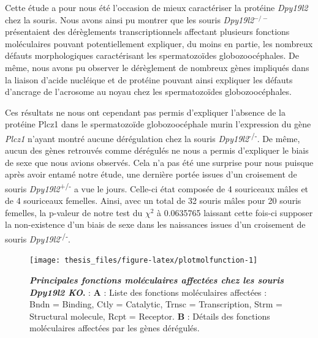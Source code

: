 \documentclass[12pt,twoside]{ugathesis}
\begin{document}
Cette étude a pour nous été l'occasion de mieux caractériser la protéine
\emph{Dpy19l2} chez la souris. Nous avons ainsi pu montrer que les
souris \emph{Dpy19l2}\(^{-/-}\) présentaient des dérèglements
transcriptionnels affectant plusieurs fonctions moléculaires pouvant
potentiellement expliquer, du moins en partie, les nombreux défauts
morphologiques caractérisant les spermatozoïdes globozoocéphales. De
même, nous avons pu observer le dérèglement de nombreux gènes impliqués
dans la liaison d'acide nucléique et de protéine pouvant ainsi expliquer
les défauts d'ancrage de l'acrosome au noyau chez les spermatozoïdes
globozoocéphales.

Ces résultats ne nous ont cependant pas permis d'expliquer l'absence de
la protéine Plcz1 dans le spermatozoïde globozoocéphale murin
l'expression du gène \emph{Plcz1} n'ayant montré aucune dérégulation
chez la souris \emph{Dpy19l2}\textsuperscript{-/-}. De même, aucun des
gènes retrouvés comme dérégulés ne nous a permis d'expliquer le biais de
sexe que nous avions observés. Cela n'a pas été une surprise pour nous
puisque après avoir entamé notre étude, une dernière portée issues d'un
croisement de souris \emph{Dpy19l2}\textsuperscript{+/-} a vue le jours.
Celle-ci état composée de 4 souriceaux mâles et de 4 souriceaux
femelles. Ainsi, avec un total de 32 souris mâles pour 20 souris
femelles, la p-valeur de notre test du \(\chi^2\) à 0.0635765 laissant
cette fois-ci supposer la non-existence d'un biais de sexe dans les
naissances issues d'un croisement de souris
\emph{Dpy19l2}\textsuperscript{-/-}.

\newpage 

\begin{figure}

{\centering \texttt{[image: thesis\_files/figure-latex/plotmolfunction-1]} 

}

\caption[Principales fonctions moléculaires affectées chez les souris *Dpy19l2* KO]{\textbf{\emph{Principales fonctions moléculaires
affectées chez les souris \emph{Dpy19l2} KO}.} : \textbf{A} : Liste des
fonctions moléculaires affectées : Bndn = Binding, Ctly = Catalytic,
Trnsc = Transcription, Strm = Structural molecule, Rcpt = Receptor.
\textbf{B} : Détails des fonctions moléculaires affectées par les gènes
dérégulés.}\label{fig:plotmolfunction}
\end{figure}
\end{document}
